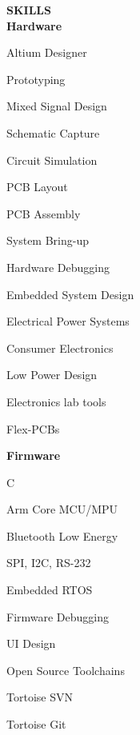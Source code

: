 \documentclass[10pt,letterpaper]{article}
\begin{document}
\vspace*{\fill}

{\noindent\sc\bf SKILLS}\vspace{.3pc}\\ 
{\indent\indent\sc\bf Hardware}
 \begin{multicols}{3}
\begin{itemize}[leftmargin=0.75in, rightmargin=0.25in, topsep=0in, itemindent=0in, label=\textrm{--}]
 {\small\sl
\item Altium Designer
\item Prototyping
\item Mixed Signal Design
\item Schematic Capture
\item Circuit Simulation
\item PCB Layout
\item PCB Assembly
\item System Bring-up
\item Hardware Debugging
\item Embedded System Design
\item Electrical Power Systems
\item Consumer Electronics
\item Low Power Design
\item Electronics lab tools
\item Flex-PCBs

}
\end{itemize}
\end{multicols}
{\indent\indent\sc\bf Firmware}
 \begin{multicols}{3}
 \begin{itemize}[leftmargin=0.75in, rightmargin=0.25in, topsep=0mm,itemindent=0mm, label=\textrm{--}]
  {\small\sl
\item  C 
\item Arm Core MCU/MPU
\item Bluetooth Low Energy
\item SPI, I2C, RS-232
\item Embedded RTOS
\item Firmware Debugging
\item UI Design
\item Open Source Toolchains
\item Tortoise SVN
\item Tortoise Git
}
\end{itemize}
\end{multicols}
\end{document}
